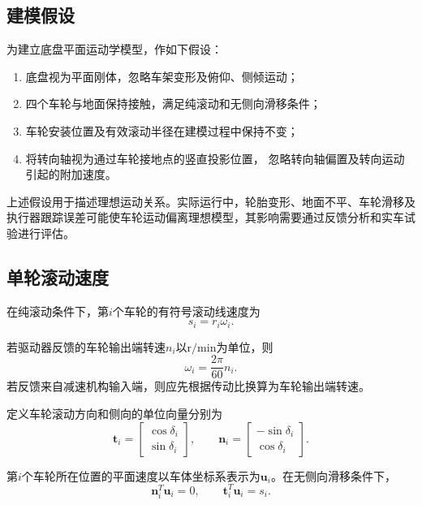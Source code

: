 \documentclass[UTF8,12pt,a4paper,openany]{ctexbook}
\begin{document}
\subsection{建模假设}

为建立底盘平面运动学模型，作如下假设：

\begin{enumerate}
    \item 底盘视为平面刚体，忽略车架变形及俯仰、侧倾运动；
    \item 四个车轮与地面保持接触，满足纯滚动和无侧向滑移条件；
    \item 车轮安装位置及有效滚动半径在建模过程中保持不变；
    \item 将转向轴视为通过车轮接地点的竖直投影位置，
          忽略转向轴偏置及转向运动引起的附加速度。
\end{enumerate}

上述假设用于描述理想运动关系。实际运行中，轮胎变形、地面不平、车轮滑移及执行器跟踪误差可能使车轮运动偏离理想模型，其影响需要通过反馈分析和实车试验进行评估。

\subsection{单轮滚动速度}

在纯滚动条件下，第$i$个车轮的有符号滚动线速度为
\begin{equation}
    s_i=r_i\omega_i.
    \label{eq:kc-rolling-speed}
\end{equation}

若驱动器反馈的车轮输出端转速$n_i$以$\mathrm{r/min}$为单位，则
\begin{equation}
    \omega_i=\frac{2\pi}{60}n_i.
    \label{eq:kc-rpm-conversion}
\end{equation}
若反馈来自减速机构输入端，则应先根据传动比换算为车轮输出端转速。

定义车轮滚动方向和侧向的单位向量分别为
\begin{equation}
    \boldsymbol{t}_i
    =
    \begin{bmatrix}
        \cos\delta_i\\
        \sin\delta_i
    \end{bmatrix},
    \qquad
    \boldsymbol{n}_i
    =
    \begin{bmatrix}
        -\sin\delta_i\\
        \cos\delta_i
    \end{bmatrix}.
\end{equation}

第$i$个车轮所在位置的平面速度以车体坐标系表示为$\boldsymbol{u}_i$。在无侧向滑移条件下，
\begin{equation}
    \boldsymbol{n}_i^{T}\boldsymbol{u}_i=0,
    \qquad
    \boldsymbol{t}_i^{T}\boldsymbol{u}_i=s_i.
\end{equation}
\end{document}
